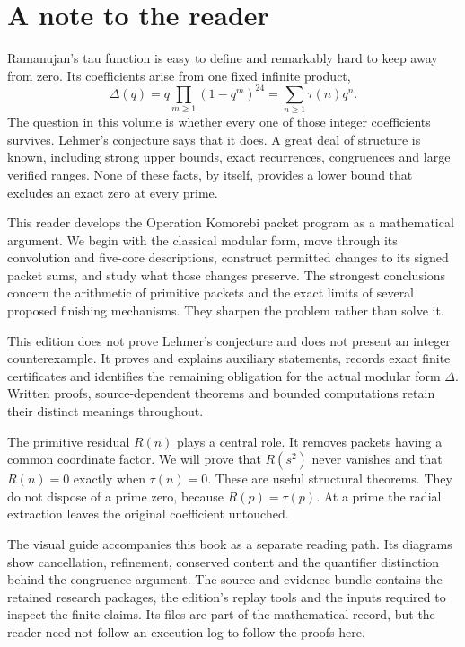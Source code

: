 \chapter*{A note to the reader}
Ramanujan's tau function is easy to define and remarkably hard to keep away from zero. Its coefficients arise from one fixed infinite product,
\[
\Delta(q)=q\prod_{m\ge1}(1-q^m)^{24}=\sum_{n\ge1}\tau(n)q^n.
\]
The question in this volume is whether every one of those integer coefficients survives. Lehmer's conjecture says that it does. A great deal of structure is known, including strong upper bounds, exact recurrences, congruences and large verified ranges. None of these facts, by itself, provides a lower bound that excludes an exact zero at every prime.

This reader develops the Operation Komorebi packet program as a mathematical argument. We begin with the classical modular form, move through its convolution and five-core descriptions, construct permitted changes to its signed packet sums, and study what those changes preserve. The strongest conclusions concern the arithmetic of primitive packets and the exact limits of several proposed finishing mechanisms. They sharpen the problem rather than solve it.

\begin{claimboundary}
This edition does not prove Lehmer's conjecture and does not present an integer counterexample. It proves and explains auxiliary statements, records exact finite certificates and identifies the remaining obligation for the actual modular form $\Delta$. Written proofs, source-dependent theorems and bounded computations retain their distinct meanings throughout.
\end{claimboundary}

The primitive residual $R(n)$ plays a central role. It removes packets having a common coordinate factor. We will prove that $R(s^2)$ never vanishes and that $R(n)=0$ exactly when $\tau(n)=0$. These are useful structural theorems. They do not dispose of a prime zero, because $R(p)=\tau(p)$. At a prime the radial extraction leaves the original coefficient untouched.

The visual guide accompanies this book as a separate reading path. Its diagrams show cancellation, refinement, conserved content and the quantifier distinction behind the congruence argument. The source and evidence bundle contains the retained research packages, the edition's replay tools and the inputs required to inspect the finite claims. Its files are part of the mathematical record, but the reader need not follow an execution log to follow the proofs here.


